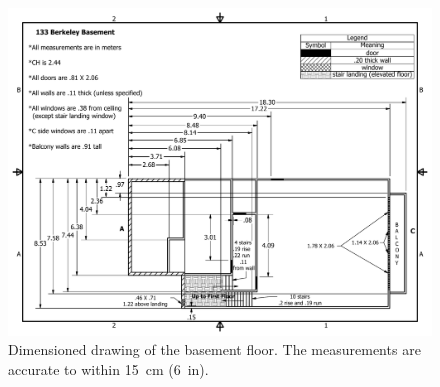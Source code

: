 \documentclass[12pt,oneside]{book}
\begin{document}
\begin{figure}
\includegraphics[width=8in]{../Figures/Drawing_Basement_Metric}
\caption[Dimensioned drawing of the basement floor.]
{Dimensioned drawing of the basement floor. The measurements are accurate to within 15~cm (6~in).}
\label{fig:drawing_basement}
\end{figure}
\end{document}
